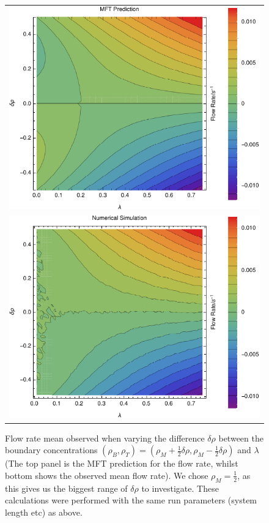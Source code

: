 \begin{figure}[h!]
\vspace{1em}
\caption{\label{fig:constDens} Flow rate mean observed when varying the difference $\delta\rho$ between the boundary concentrations
$(\rho_B, \rho_T) = (\rho_M + \frac{1}{2} \delta\rho, \rho_M - \frac{1}{2} \delta\rho)$ and $\lambda$ (The top panel is the MFT prediction
for the flow rate, whilst bottom shows the observed mean flow rate).
We chose $\rho_M=\frac{1}{2}$, as this gives us the biggest range of $\delta\rho$ to investigate.
These calculations were performed with the same run parameters (system length etc)
as above.}
\begin{center}
 \begin{tabular}{c}
    \includegraphics[width=0.98\linewidth]{../tex-src/images/constDens/newMftPred} \\
    \includegraphics[width=0.98\linewidth]{../tex-src/images/constDens/newFlow}
    \end{tabular}
\end{center}
    \vspace{-2.5em}
\end{figure}
